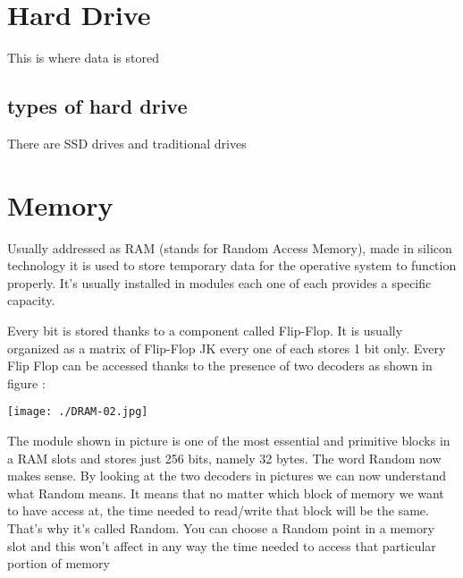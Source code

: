 \documentclass[a4paper,12pt]{article}
\begin{document}


\clearpage

\section{Hard Drive}
This is where data is stored
\subsection{types of hard drive}
There are SSD drives and traditional drives
\clearpage

\section{Memory}

Usually addressed as RAM (stands for Random Access Memory), made in silicon technology it is used to store temporary data for the operative system to function properly. It's usually installed in modules each one of each provides a specific capacity.

Every bit is stored thanks to a component called Flip-Flop. It is usually organized as a matrix of Flip-Flop JK every one of each stores 1 bit only. Every Flip Flop can be accessed thanks to the presence of two decoders as shown in figure :
 
\texttt{[image: ./DRAM-02.jpg]}

The module shown in picture is one of the most essential and primitive blocks in a RAM slots and stores just 256 bits, namely 32 bytes. 
The word Random now makes sense. By looking at the two decoders in pictures we can now understand what Random means. It means that no matter which block of memory we want to have access at, the time needed to read/write that block will be the same. That's why it's called Random. You can choose a Random point in a memory slot and this won't affect in any way the time needed to access that particular portion of memory
\end{document}
